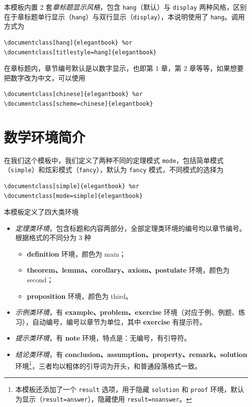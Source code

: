 \documentclass[lang=cn,newtx,10pt,scheme=chinese]{elegantbook}
\begin{document}
本模板内置 2 套\textit{章标题显示风格}，包含 \lstinline{hang}（默认）与 \lstinline{display} 两种风格，区别在于章标题单行显示（\lstinline{hang}）与双行显示（\lstinline{display}），本说明使用了 \lstinline{hang}。调用方式为
\begin{lstlisting}
\documentclass[hang]{elegantbook} %or
\documentclass[titlestyle=hang]{elegantbook}
\end{lstlisting}

在章标题内，章节编号默认是以数字显示，也即{\kaishu 第 1 章}，{\kaishu 第 2 章}等等，如果想要把数字改为中文，可以使用
\begin{lstlisting}
\documentclass[chinese]{elegantbook} %or
\documentclass[scheme=chinese]{elegantbook}
\end{lstlisting}

\section{数学环境简介}

在我们这个模板中，我们定义了两种不同的定理模式 \lstinline{mode}，包括简单模式（\lstinline{simple}）和炫彩模式（\lstinline{fancy}），默认为 \lstinline{fancy} 模式，不同模式的选择为
\begin{lstlisting}
\documentclass[simple]{elegantbook} %or
\documentclass[mode=simple]{elegantbook}
\end{lstlisting}

本模板定义了四大类环境

\begin{itemize}
  \item \textit{定理类环境}，包含标题和内容两部分，全部定理类环境的编号均以章节编号。根据格式的不同分为 3 种
    \begin{itemize}
      \item \textcolor{main}{\textbf{definition}} 环境，颜色为 \textcolor{main}{main}；
      \item \textcolor{second}{\textbf{theorem、lemma、corollary、axiom、postulate}} 环境，颜色为 \textcolor{second} {second}；
      \item \textcolor{third}{\textbf{proposition}} 环境，颜色为 \textcolor{third}{third}。
    \end{itemize}
  \item \textit{示例类环境}，有 \textbf{example、problem、exercise} 环境（对应于例、例题、练习），自动编号，编号以章节为单位，其中 \textbf{exercise} 有提示符。
  \item \textit{提示类环境}，有 \textbf{note} 环境，特点是：无编号，有引导符。
  \item \textit{结论类环境}，有 \textbf{conclusion、assumption、property、remark、solution} 环境\footnote{本模板还添加了一个 \lstinline|result| 选项，用于隐藏 \lstinline{solution} 和 \lstinline{proof} 环境，默认为显示（\lstinline{result=answer}），隐藏使用 \lstinline{result=noanswer}。}，三者均以粗体的引导词为开头，和普通段落格式一致。
\end{itemize}
\end{document}
